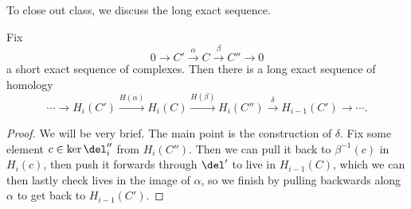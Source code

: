 To close out class, we discuss the long exact sequence.
\begin{theorem}
	Fix
	\[0\to C'\stackrel\alpha\to C\stackrel\beta\to C''\to0\]
	a short exact sequence of complexes. Then there is a long exact sequence of homology
	\[\cdots\to H_i(C')\stackrel{H(\alpha)}\to H_i(C)\stackrel{H(\beta)}\to H_i(C'')\stackrel{\delta}\to H_{i-1}(C')\to\cdots.\]
\end{theorem}
\begin{proof}
	We will be very brief. The main point is the construction of $\delta$. Fix some element $c\in\ker\del_i''$ from $H_i(C'')$. Then we can pull it back to $\beta^{-1}(c)$ in $H_i(c)$, then push it forwards through $\del'$ to live in $H_{i-1}(C)$, which we can then lastly check lives in the image of $\alpha$, so we finish by pulling backwards along $\alpha$ to get back to $H_{i-1}(C')$.
\end{proof}